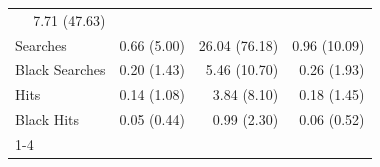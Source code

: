 \begin{table}[!h]
\begin{tabular}{llll}
  \multicolumn{1}{r}{7.71 (47.63)} \\
\multicolumn{1}{l}{\hspace{1em}Searches} &
  \multicolumn{1}{r}{0.66 (5.00)} &
  \multicolumn{1}{r}{26.04 (76.18)} &
  \multicolumn{1}{r}{0.96 (10.09)} \\
\multicolumn{1}{l}{\hspace{1em}Black Searches} &
  \multicolumn{1}{r}{0.20 (1.43)} &
  \multicolumn{1}{r}{5.46 (10.70)} &
  \multicolumn{1}{r}{0.26 (1.93)} \\
\multicolumn{1}{l}{\hspace{1em}Hits} &
  \multicolumn{1}{r}{0.14 (1.08)} &
  \multicolumn{1}{r}{3.84 (8.10)} &
  \multicolumn{1}{r}{0.18 (1.45)} \\
\multicolumn{1}{l}{\hspace{1em}Black Hits} &
  \multicolumn{1}{r}{0.05 (0.44)} &
  \multicolumn{1}{r}{0.99 (2.30)} &
  \multicolumn{1}{r}{0.06 (0.52)} \\
\cline{1-4}
\end{tabular}
\end{table}
